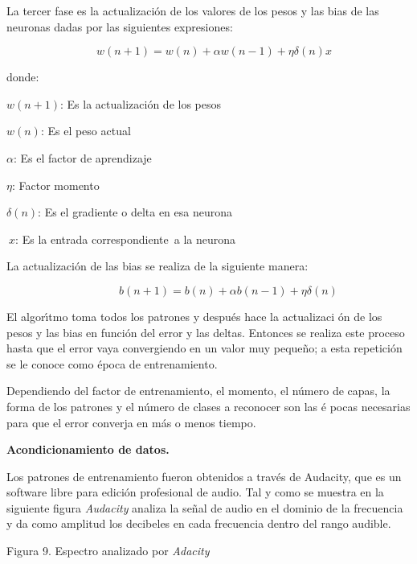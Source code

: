La tercer fase es la actualizaci\'{o}n de los valores de los pesos y las
bias de las neuronas dadas por las siguientes expresiones:

$\qquad \qquad \qquad \qquad w(n+1)=w(n)+\alpha w(n-1)+\eta \delta (n)x$

donde:

$w(n+1)$: Es la actualizaci\'{o}n de los pesos

$w(n)$: Es el peso actual

$\alpha $: Es el factor de aprendizaje

$\eta $: Factor momento

$\delta (n)$: Es el gradiente o delta en esa neurona

$\ x$: Es la entrada correspondiente\ a la neurona

\bigskip La actualizaci\'{o}n de las bias se realiza de la siguiente manera:

$\qquad \qquad \qquad \qquad \qquad b(n+1)=b(n)+\alpha b(n-1)+\eta \delta (n)
$

El algor\'{\i}tmo toma todos los patrones y despu\'{e}s hace la actualizaci%
\'{o}n de los pesos y las bias en funci\'{o}n del error y las deltas.
Entonces se realiza este proceso hasta que el error vaya convergiendo en un
valor muy peque\~{n}o; a esta repetici\'{o}n se le conoce como \'{e}poca de
entrenamiento.

Dependiendo del factor de entrenamiento, el momento, el n\'{u}mero de capas,
la forma de los patrones y el n\'{u}mero de clases a reconocer son las \'{e}%
pocas necesarias para que el error converja en m\'{a}s o menos tiempo.

\textbf{ Acondicionamiento de datos.}

Los patrones de entrenamiento fueron obtenidos a trav\'{e}s de Audacity, que
es un software libre para edici\'{o}n profesional de audio. Tal y como se
muestra en la siguiente figura \textit{Audacity} analiza la se\~{n}al de
audio en el dominio de la frecuencia y da como amplitud los decibeles en
cada frecuencia dentro del rango audible.

\begin{center}
\qquad \qquad \qquad {}

\qquad \qquad \qquad Figura 9. Espectro analizado por \textit{Adacity}
\end{center}

